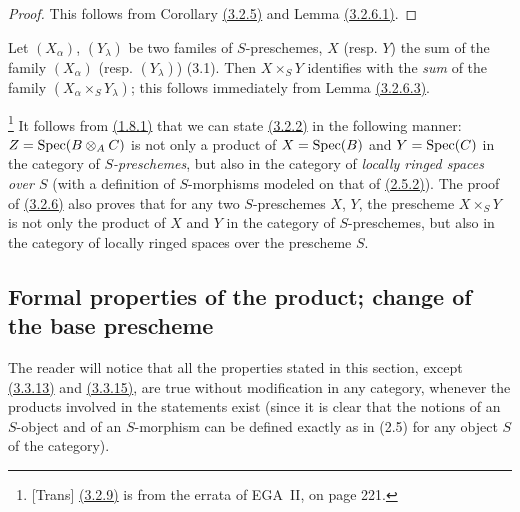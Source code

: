 \begin{proof}
\label{proof-cor-1.3.2.7}
This follows from Corollary \hyperref[cor-1.3.2.5]{(3.2.5)} and Lemma \hyperref[lem-1.3.2.6.1]{(3.2.6.1)}.
\end{proof}

\begin{env}[3.2.8]
\label{env-1.3.2.8}
Let $(X_\alpha)$, $(Y_\lambda)$ be two familes of $S$-preschemes, $X$ (resp. $Y$) the sum
of the family $(X_\alpha)$ (resp. $(Y_\lambda)$) (3.1). Then $X\times_S Y$ identifies with
the {\it sum} of the family $(X_\alpha\times_S Y_\lambda)$; this follows immediately from
Lemma \hyperref[lem-1.3.2.6.3]{(3.2.6.3)}.
\end{env}

\begin{env}[3.2.9]
\label{env-1.3.2.9}
\footnote{[Trans] \hyperref[env-1.3.2.9]{(3.2.9)} is from the errata of EGA~II, on page 221.}
It follows from \hyperref[prop-1.1.8.1]{(1.8.1)} that we can state \hyperref[prop-1.3.2.2]{(3.2.2)} in the following
manner: $Z={\mathop{\mathrm{Spec}}\nolimits}(B\otimes_A C)$ is not only a product of $X={\mathop{\mathrm{Spec}}\nolimits}(B)$ and $Y={\mathop{\mathrm{Spec}}\nolimits}(C)$ in the
category of {\it $S$-preschemes}, but also in the category of {\it locally ringed spaces
over $S$} (with a definition of $S$-morphisms modeled on that of \hyperref[env-1.2.5.2]{(2.5.2)}). The
proof of \hyperref[thm-1.3.2.6]{(3.2.6)} also proves that for any two $S$-preschemes $X$, $Y$, the
prescheme $X\times_S Y$ is not only the product of $X$ and $Y$ in the category of
$S$-preschemes, but also in the category of locally ringed spaces over the prescheme $S$.
\end{env}

\subsection{Formal properties of the product; change of the base prescheme}
\label{subsection-product-formal-prop-and-base-change}

\begin{env}[3.3.1]
\label{env-1.3.3.1}
The reader will notice that all the properties stated in this section, except
\hyperref[env-1.3.3.13]{(3.3.13)} and \hyperref[env-1.3.3.15]{(3.3.15)}, are true without modification in any
category, whenever the products involved in the statements exist (since it is
clear that the notions of an $S$-object and of an $S$-morphism can be defined
exactly as in (2.5) for any object $S$ of the category).
\end{env}


